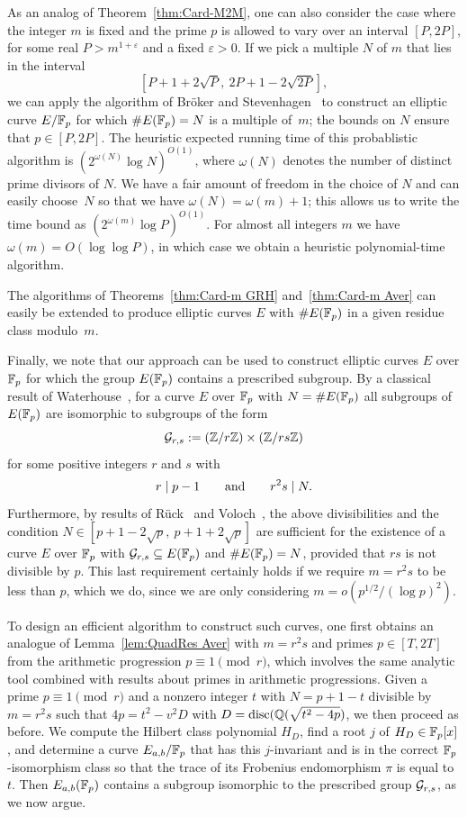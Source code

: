\documentclass[12pt]{amsart}
\begin{document}
As an analog of Theorem~\ref{thm:Card-M2M}, one can also consider the case where the integer $m$ is fixed and the prime $p$ is allowed to vary over an interval $[P,2P]$, for some real $P > m^{1+\varepsilon}$ and a fixed $\varepsilon > 0$. 
If we pick a multiple $N$ of $m$ that lies in the interval
$$
[P+1+2\sqrt{P},\ 2P+1-2\sqrt{2P}],
$$ we can apply the algorithm of Br\"oker and Stevenhagen~\cite{BrSt} to construct an elliptic curve $E/\mathbb{F}_p$ for which $\#E(\mathbb{F}_p)=N$ is a multiple of~$m$; the bounds on $N$ ensure that $p\in [P,2P]$.  The heuristic expected running time of this probablistic algorithm is
$(2^{\omega(N)}\log N)^{O(1)}$, where $\omega(N)$ denotes the number of distinct prime divisors of $N$.  We have a fair amount of freedom in the choice of $N$ and can easily choose~$N$ so that we have $\omega(N)=\omega(m)+1$; this allows us to write the time bound as $(2^{\omega(m)}\log P)^{O(1)}$.
For almost all integers $m$ we have $\omega(m)=O(\log \log P)$, in which case we obtain a heuristic polynomial-time algorithm.

The algorithms of Theorems~\ref{thm:Card-m GRH} 
and~\ref{thm:Card-m Aver} can easily be extended to produce elliptic curves 
$E$ with $\# E(\mathbb{F}_p)$ in a given residue class modulo~$m$.

Finally, we note that our approach can be used to construct elliptic 
curves $E$ over $\mathbb{F}_p$ for which the group $E(\mathbb{F}_p)$ contains a 
prescribed subgroup. By a classical result of Waterhouse~\cite{Wa},
for a curve $E$ over $\mathbb{F}_p$ with $N=\#E(\mathbb{F}_p)$ 
all subgroups of $E(\mathbb{F}_p)$ are isomorphic to 
subgroups of the form 
$$
{\mathcal G}_{r,s} := (\mathbb{Z}/r\mathbb{Z}) \times (\mathbb{Z}/rs\mathbb{Z})
$$
for some positive integers $r$ and $s$ with 
$$
r\mid p-1 \qquad\mbox{and}\qquad r^2s  \mid  N.
$$
Furthermore, by results of R\"uck~\cite{Ru} and Voloch~\cite{Vol},
the above divisibilities and the condition 
$N\in [p+1-2\sqrt{p},\ p+1+2\sqrt{p}]$ are sufficient 
for the existence of a curve $E$ over $\mathbb{F}_p$ with 
${\mathcal G}_{r,s} \subseteq E(\mathbb{F}_p)$ and $\#E(\mathbb{F}_p)=N$, provided that $rs$ is not divisible by $p$.
This last requirement certainly holds if we require $m=r^2s$ to be less than $p$, which we do, since we are only considering $m=o(p^{1/2}/(\log p)^2)$.

To design an efficient algorithm to construct such curves, one first
obtains an analogue of Lemma~\ref{lem:QuadRes Aver} with $m = r^2s$ 
and primes $p\in [T, 2T]$ from the arithmetic progression 
$p \equiv 1 \pmod r$, which involves the same analytic tool
combined with results about primes in arithmetic 
progressions.
Given a prime $p\equiv 1\pmod r$ and a nonzero integer $t$
with $N=p+1-t$ divisible by $m=r^2s$ such that $4p=t^2-v^2D$ with
$D={\rm disc}(\mathbb{Q}(\sqrt{t^2-4p})$,
we then proceed as before.  We compute the Hilbert class polynomial $H_D$,
find a root $j$ of $H_D\in \mathbb{F}_p[x]$, and determine a curve $E_{a,b}/\mathbb{F}_p$ that
has this $j$-invariant and is in the correct $\mathbb{F}_p$-isomorphism class so
that the trace of its Frobenius endomorphism $\pi$ is equal to $t$.
Then $E_{a,b}(\mathbb{F}_p)$ contains a subgroup isomorphic to the prescribed group ${\mathcal G}_{r,s}$, as we now argue.
\end{document}
